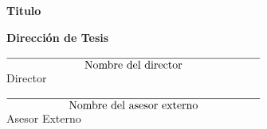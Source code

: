 \begin{titlepage}
    
    \begin{center}
    \textbf{Titulo}\\
    
    \vspace{1cm}
    
        \textbf{Dirección de Tesis}
        
          \vspace{1.5cm}
        
         $\underset{\text{\normalsize Nombre del director}}{\underline{\hspace{8cm}}}$\\
         \vspace{0.2cm}
         \textrm{Director}
         
        \vspace{1.5cm}
         
         $\underset{\text{\normalsize Nombre del asesor externo}}{\underline{\hspace{8cm}}}$\\
         \vspace{0.2cm}
         \textrm{Asesor Externo}
        
    \end{center}
\end{titlepage}
    